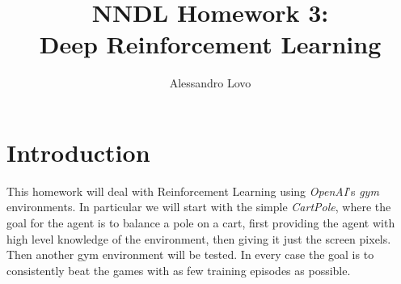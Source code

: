 \documentclass[a4paper, 11pt]{article}
\begin{document}
\title{NNDL Homework 3: \\ Deep Reinforcement Learning}
\author{Alessandro Lovo}
\maketitle

\section{Introduction}
  This homework will deal with Reinforcement Learning using \emph{OpenAI}'s \emph{gym} environments. In particular we will start with the simple \emph{CartPole}, where the goal for the agent is to balance a pole on a cart, first providing the agent with high level knowledge of the environment, then giving it just the screen pixels. Then another gym environment will be tested. In every case the goal is to consistently beat the games with as few training episodes as possible.
\end{document}
